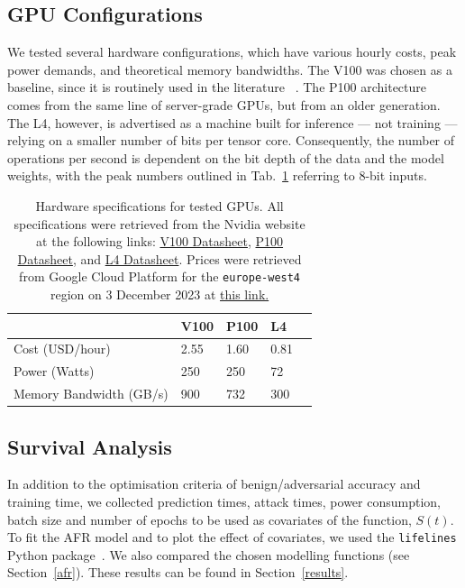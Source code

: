 \documentclass[conference]{IEEEtran}
\begin{document}
\subsection{GPU Configurations}
We tested several hardware configurations, which have various hourly costs, peak power demands, and theoretical memory bandwidths. The V100 was chosen as a baseline, since it is  routinely used in the literature ~\cite{svedin2021benchmarking,xu2018deep}. The P100 architecture comes from the same line of server-grade GPUs, but from an older generation. The L4, however, is advertised as a machine built for inference --- not training --- relying on a smaller number of bits per tensor core. Consequently, the number of operations per second is dependent on the bit depth of the data and the model weights, with the peak numbers outlined in Tab.~\ref{tab:hardware} referring to 8-bit inputs.

\begin{table}[h]
    \centering
    \begin{tabular}{lllll}
    \toprule
                            & V100   & P100   & L4    &  \\
    \midrule
    Cost (USD/hour)         & 2.55   & 1.60   & 0.81   &  \\
    Power (Watts)           & 250    & 250    & 72    &  \\
    Memory Bandwidth (GB/s) & 900    & 732    & 300   &  \\
    \bottomrule
    \end{tabular}
    \caption{Hardware specifications for tested GPUs. All specifications were retrieved from the Nvidia website at the following links: 
    \href{https://images.nvidia.com/content/technologies/volta/pdf/volta-v100-datasheet-update-us-1165301-r5.pdf}{V100 Datasheet},
    \href{https://images.nvidia.com/content/tesla/pdf/nvidia-tesla-p100-PCIe-datasheet.pdf}{P100 Datasheet}, and
    \href{https://nvdam.widen.net/s/rvq98gbwsw/l4-datasheet-2595652}{L4 Datasheet}. Prices were retrieved from Google Cloud Platform for the \texttt{europe-west4} region on 3 December 2023 at \href{https://cloud.google.com/pricing/list}{this link.}
    }
    \label{tab:hardware}
\end{table}

\subsection{Survival Analysis}
In addition to the optimisation criteria of benign/adversarial accuracy and training time, we collected prediction times, attack times, power consumption, batch size and number of epochs to be used as covariates of the function, $S(t)$. To fit the AFR model and to plot the effect of covariates, we used the \texttt{lifelines} Python package~\cite{lifelines}. We also compared the chosen modelling functions (see Section~\ref{afr}).  These results can be found in Section~\ref{results}.
\end{document}

